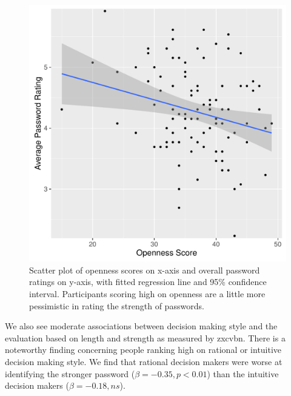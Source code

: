 \begin{figure}
	\centering
	\includegraphics[width=\linewidth]{figures/Openness-ScatterPlot3}
	\caption{\label{fig:openness-scatterplot} Scatter plot of openness scores on x-axis and overall password ratings on y-axis, with fitted regression line and 95\% confidence interval. Participants scoring high on openness are a little more pessimistic in rating the strength of passwords.}
\end{figure}


We also see moderate associations between decision making style and the evaluation based on length and strength as measured by zxcvbn. There is a noteworthy finding concerning people ranking high on rational or intuitive decision making style. We find that rational decision makers were worse at identifying the stronger password ($\beta = -0.35, p < 0.01$) than the intuitive decision makers ($\beta = -0.18, ns$).  

